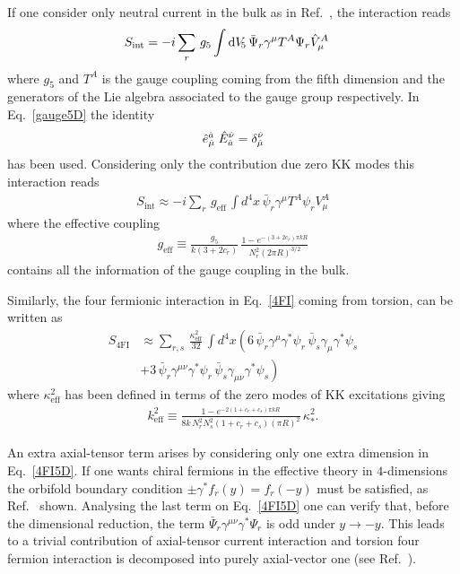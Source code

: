 If one consider only neutral current in the bulk as in Ref.~\cite{Davoudiasl:1999tf}, the interaction reads
\begin{align}
\label{gauge5D}
  S_{\text{int}} &= -i\sum_{r}\,g_5\int \dv[5]\,\bar{\Psi}_r \gamma^{\mu}T^A\Psi_r\hat{V}_\mu^A
\end{align}
where $g_5$ and $T^A$ is the gauge coupling coming from the fifth dimension and the generators of the Lie algebra associated to the gauge group respectively. In Eq.~\eqref{gauge5D} the identity
\begin{align}
\hat{e}^{\hat{a}}_{\hat{\mu}}\;\hat{E}_{\hat{a}}^{\hat{\nu}} = \delta_{\hat{\mu}}^{\hat{\nu}}
\end{align}
has been used. Considering only the contribution due zero KK modes this interaction reads 
\begin{align}
  S_{\text{int}} \approx -i \sum_{r}\,g_{\text{eff}}\,\int d^4x\,\bar{\psi}_r\gamma^\mu T^A\psi_r V_\mu^A
\end{align}
where the effective coupling
\begin{align}
  g_{\text{eff}} \equiv \frac{g_5}{k(3+2c_r)}\,\frac{1-e^{-(3+2c_r)\pi kR}}{N_r^2(2\pi R)^{3/2}}
\end{align}
contains all the information of the gauge coupling in the bulk.

Similarly, the four fermionic interaction in Eq.~\eqref{4FI} coming from torsion, can be written as
\begin{align}
  \nonumber
  S_{4\text{FI}} &\approx \sum_{r,s}\,\frac{\kappa_{\text{eff}}^2}{32}\,\int d^4x\left(6\,\bar{\psi}_{r}\gamma^\mu\gamma^*\psi_{r}\,\bar{\psi}_{s}\gamma_\mu\gamma^*\psi_{s}\right.\\
  \label{4FI5D}
  &+\left. 3\,\bar{\psi}_r\gamma^{\mu\nu}\gamma^*\psi_r\,\bar{\psi}_s\gamma_{\mu\nu}\gamma^*\psi_s\right)
\end{align}
where $\kappa_{\text{eff}}^2$ has been defined in terms of the zero modes of KK excitations giving
\begin{align}
\label{kapparel}
  k_{\text{eff}}^2 \equiv \frac{1-e^{-2(1+c_r+c_s)\pi kR}}{8k\,N_r^2N_s^2(1+c_r+c_s)(\pi R)^2}\,\kappa_*^2.
\end{align}

An extra axial-tensor term arises by considering only one extra dimension in Eq.~\eqref{4FI5D}. If one wants chiral fermions in the effective theory in $4$-dimensions the orbifold boundary condition $\pm\gamma^*f_r(y)=f_r(-y)$ must be satisfied, as Ref.~\cite{Flachi:2001bj} shown. Analysing the last term on Eq.~\eqref{4FI5D} one can verify that, before the dimensional reduction, the term $\bar{\Psi}_r\gamma^{\mu\nu}\gamma^*\Psi_r$ is odd under $y\rightarrow-y$. This leads to a trivial contribution of axial-tensor current interaction and torsion four fermion interaction is decomposed into purely axial-vector one (see Ref.~\cite{Lebedev:2002dp}).

